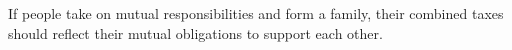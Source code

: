 If people take on mutual responsibilities and form a family, their combined taxes should reflect their mutual obligations to support each other.